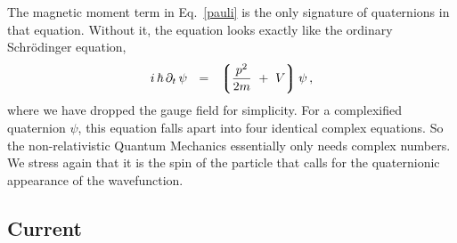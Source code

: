 \documentclass[epsfig,12pt]{article}
\newcommand{\p}{\partial}
\newcommand{\lgr}{\left\lgroup}
\newcommand{\rgr}{\right\rgroup}
\begin{document}
	The magnetic moment term in Eq.~\eqref{pauli} is the only signature of quaternions
	in that equation.
	Without it, the equation looks exactly like the ordinary Schr\"odinger equation,
\begin{equation}
\label{simple-schrod}
	i\,\hbar\,\p_t\,\psi	~~=~~
		\lgr
			\frac {p^2} {2m}
			~+~  V
		\rgr \psi\,,
\end{equation}
	where we have dropped the gauge field for simplicity.
	For a complexified quaternion $ \psi $, this equation falls apart into four
	identical complex equations.
	So the non-relativistic Quantum Mechanics essentially only needs complex numbers.
	We stress again that it is the spin of the particle that calls for the
	quaternionic appearance of the wavefunction.
	

\subsection{Current}
\label{sec-current}
\end{document}
